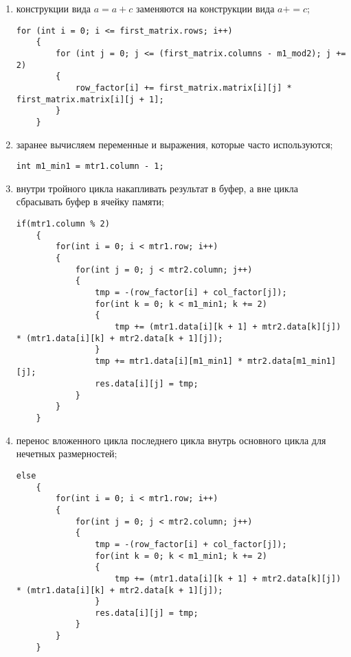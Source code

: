 \documentclass[a4paper, 14pt]{article}
\begin{document}
	\begin{enumerate}
	\item конструкции вида $a = a + c$ заменяются на конструкции вида $a += c$;
	\begin{lstlisting}[label=some-code,caption=Составное присваивание]
for (int i = 0; i <= first_matrix.rows; i++)
    {
        for (int j = 0; j <= (first_matrix.columns - m1_mod2); j += 2)
        {
            row_factor[i] += first_matrix.matrix[i][j] * first_matrix.matrix[i][j + 1];
        }
    }
\end{lstlisting}
	\item заранее вычисляем переменные и выражения, которые часто используются;
	\begin{lstlisting}[label=some-code,caption=Вынос первой итерации из цикла]
int m1_min1 = mtr1.column - 1;
\end{lstlisting}

\item внутри тройного цикла накапливать результат в буфер, а вне цикла сбрасывать буфер в ячейку памяти;
\begin{lstlisting}[label=some-code,caption=Запись в буфер]
if(mtr1.column % 2)
    {
        for(int i = 0; i < mtr1.row; i++)
        {
            for(int j = 0; j < mtr2.column; j++)
            {
                tmp = -(row_factor[i] + col_factor[j]);
                for(int k = 0; k < m1_min1; k += 2)
                {
                    tmp += (mtr1.data[i][k + 1] + mtr2.data[k][j]) * (mtr1.data[i][k] + mtr2.data[k + 1][j]);
                }
                tmp += mtr1.data[i][m1_min1] * mtr2.data[m1_min1][j];
                res.data[i][j] = tmp;
            }
        }
    }
\end{lstlisting}

\item перенос вложенного цикла последнего цикла внутрь основного цикла для нечетных размерностей;
\begin{lstlisting}[label=some-code,caption=Запись в буфер]
else
    {
        for(int i = 0; i < mtr1.row; i++)
        {
            for(int j = 0; j < mtr2.column; j++)
            {
                tmp = -(row_factor[i] + col_factor[j]);
                for(int k = 0; k < m1_min1; k += 2)
                {
                    tmp += (mtr1.data[i][k + 1] + mtr2.data[k][j]) * (mtr1.data[i][k] + mtr2.data[k + 1][j]);
                }
                res.data[i][j] = tmp;
            }
        }
    }
\end{lstlisting}
	\end{enumerate}
\end{document}
